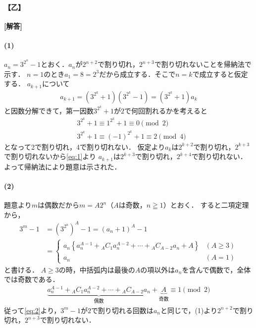 \documentclass[../../main.tex]{subfiles}
\begin{document}
\begin{oframed}
  
\end{oframed}

\paragraph{【乙】}

{\bf [解答]}

\paragraph{(1)}

$a_n=3^{2^n}-1$とおく．$a_n$が$2^{n+2}$で割り切れ，$2^{n+3}$で割り切れないことを帰納法で示す．
$n=1$のとき$a_1=8=2^3$だから成立する．そこで$n=k$で成立すると仮定する．
$a_{k+1}$について
\begin{align}
  a_{k+1}=(3^{2^k}+1)(3^{2^k}-1) = (3^{2^k}+1)a_{k} \label{eq:1}
\end{align}
と因数分解できて，第一因数$3^{2^k}+1$が$2$で何回割れるかを考えると
\begin{align}
  & 3^{2^k}+1\equiv 1^{2^k}+1\equiv0\pmod{2}\\
  & 3^{2^k}+1\equiv(-1)^{2^k}+1\equiv2\pmod{4}
\end{align}
となって2で割り切れ，4で割り切れない．
仮定より$a_{k}$は$2^{k+2}$で割り切れ，$2^{k+3}$で割り切れないから\cref{eq:1}より
$a_{k+1}$は$2^{k+3}$で割り切れ，$2^{k+4}$で割り切れない．よって帰納法により題意は示された．

\paragraph{(2)}
題意より$m$は偶数だから$m=A2^n$（$A$は奇数，$n\geqq1$）とおく．
すると二項定理から，
\begin{align}
  3^m-1
  &=(3^{2^n})^A-1=(a_n+1)^A-1\\
  &=
  \begin{cases}
    a_n\left\{a_n^{A-1}+{}_AC_{1}a_n^{A-2}+\cdots+{}_AC_{A-2}a_n+A\right\} & (A \ge 3) \\
    a_n & (A=1)
  \end{cases} \label{eq:2}
\end{align}
と書ける．
$A \ge 3$の時，中括弧内は最後の$A$の項以外は$a_n$を含んで偶数で，全体では奇数である．
\begin{align}
  \underbrace{a_n^{A-1}+{}_AC_{1}a_n^{A-2}+\cdots+{}_AC_{A-2}a_n}_{\text{偶数}}+\underbrace{A}_{\text{奇数}} \equiv 1 \pmod 2
\end{align}
従って\cref{eq:2}より，$3^m-1$が$2$で割り切れる回数は$a_n$と同じで，(1)より$2^{n+2}$で割り切れ，$2^{n+3}$で割り切れない．
\end{document}
